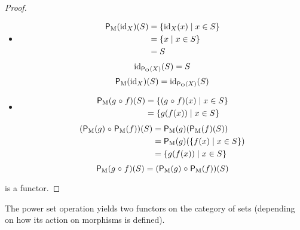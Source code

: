 \begin{example}
  \begin{proof}
    \hfill
    \begin{itemize}
    \item
      \begin{align*}
        \mathsf{P}_{\operatorname{M}}(\operatorname{id}_{X})(S) & = \{\operatorname{id}_{X}(x) \mid x \in S\}\\
                              & = \{x \mid x \in S\}\\
                              & = S
      \end{align*}
      \begin{equation*}
        \operatorname{id}_{\mathsf{P}_{\operatorname{O}}(X)}(S) = S
      \end{equation*}
      \begin{equation*}
        \mathsf{P}_{\operatorname{M}}(\operatorname{id}_{X})(S) = \operatorname{id}_{\mathsf{P}_{\operatorname{O}}(X)}(S)
      \end{equation*}
    \item
      \begin{align*}
        \mathsf{P}_{\operatorname{M}}(g \mathrel{\circ} f)(S) & = \{(g \mathrel{\circ} f)(x) \mid x \in S \}\\
                                & = \{g(f(x)) \mid x \in S \}
      \end{align*}
      \begin{align*}
        (\mathsf{P}_{\operatorname{M}}(g) \mathrel{\circ} \mathsf{P}_{\operatorname{M}}(f))(S)
          & = \mathsf{P}_{\operatorname{M}}(g)(\mathsf{P}_{\operatorname{M}}(f)(S))\\
          & = \mathsf{P}_{\operatorname{M}}(g)(\{f(x) \mid x \in S\})\\
          & = \{g(f(x)) \mid x \in S\}
      \end{align*}
      \begin{equation*}
        \mathsf{P}_{\operatorname{M}}(g \mathrel{\circ} f)(S) = (\mathsf{P}_{\operatorname{M}}(g) \mathrel{\circ} \mathsf{P}_{\operatorname{M}}(f))(S)
      \end{equation*}
    \end{itemize}
     is a functor.
  \end{proof}

  \begin{note}
    The power set operation yields two functors on the category of
    sets (depending on how its action on morphisms is defined).
  \end{note}

\end{example}


